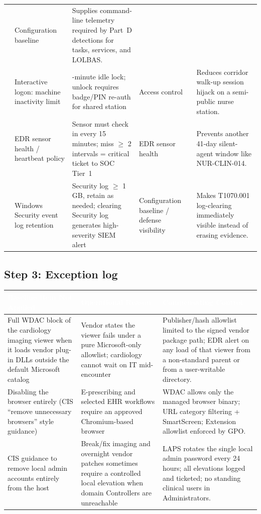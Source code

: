 \documentclass[11pt,letterpaper]{article}
\renewcommand{\arraystretch}{1.28}
\newcommand{\labtablesetup}{%
  \small
  \setlength{\tabcolsep}{6pt}%
  \renewcommand{\arraystretch}{1.45}%
}
\begin{document}
\begin{tabularx}{\textwidth}{@{}>{\bfseries\centering\arraybackslash}p{0.55cm} >{\RaggedRight\arraybackslash}p{2.35cm} >{\RaggedRight\arraybackslash}X >{\RaggedRight\arraybackslash}p{2.05cm} >{\RaggedRight\arraybackslash}X@{}}
  & Configuration baseline
  & Supplies command-line telemetry required by Part~D detections for tasks, services, and LOLBAS. \\
7 & Interactive logon: machine inactivity limit
  & 5-minute idle lock; unlock requires badge/PIN re-auth for shared station
  & Access control
  & Reduces corridor walk-up session hijack on a semi-public nurse station. \\
8 & EDR sensor health / heartbeat policy
  & Sensor must check in every 15 minutes; miss $\geq$ 2 intervals = critical ticket to SOC Tier~1
  & EDR sensor health
  & Prevents another 41-day silent-agent window like NUR-CLIN-014. \\
9 & Windows Security event log retention
  & Security log $\geq$ 1\,GB, retain as needed; clearing Security log generates high-severity SIEM alert
  & Configuration baseline / defense visibility
  & Makes T1070.001 log-clearing immediately visible instead of erasing evidence. \\
\bottomrule
\end{tabularx}
\endgroup

\subsection*{Step 3: Exception log}

\begingroup\labtablesetup
{}
\begin{tabularx}{\textwidth}{@{}>{\RaggedRight\arraybackslash}p{3.2cm} >{\RaggedRight\arraybackslash}p{3.4cm} >{\RaggedRight\arraybackslash}X@{}}
\toprule
\rowcolor{tblhead}
\textcolor{white}{\textbf{Baseline Item Not Applied}} &
\textcolor{white}{\textbf{Operational Reason}} &
\textcolor{white}{\textbf{Compensating Control}} \\
\midrule
Full WDAC block of the cardiology imaging viewer when it loads vendor plug-in DLLs outside the default Microsoft catalog
  & Vendor states the viewer fails under a pure Microsoft-only allowlist; cardiology cannot wait on IT mid-encounter
  & Publisher/hash allowlist limited to the signed vendor package path; EDR alert on any load of that viewer from a non-standard parent or from a user-writable directory. \\
Disabling the browser entirely (CIS ``remove unnecessary browsers'' style guidance)
  & E-prescribing and selected EHR workflows require an approved Chromium-based browser
  & WDAC allows only the managed browser binary; URL category filtering + SmartScreen; Extension allowlist enforced by GPO. \\
CIS guidance to remove local admin accounts entirely from the host
  & Break/fix imaging and overnight vendor patches sometimes require a controlled local elevation when domain Controllers are unreachable
  & LAPS rotates the single local admin password every 24 hours; all elevations logged and ticketed; no standing clinical users in Administrators. \\
\bottomrule
\end{tabularx}
\endgroup
\end{document}

